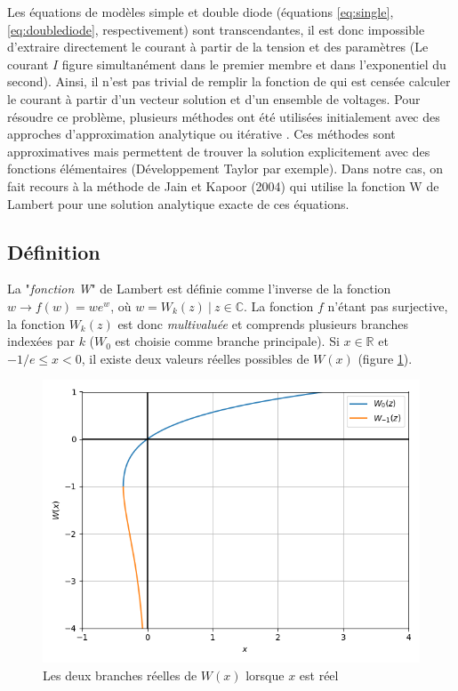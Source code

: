 Les équations de modèles simple et double diode (équations \ref{eq:single}, \ref{eq:doublediode}, respectivement) sont transcendantes, il est donc impossible d'extraire directement le courant à partir de la tension et des paramètres (Le courant $I$ figure simultanément dans le premier membre et dans l'exponentiel du second). Ainsi, il n'est pas trivial de remplir la fonction de  qui est censée calculer le courant à partir d'un vecteur solution et d'un ensemble de voltages. Pour résoudre ce problème, plusieurs méthodes ont été utilisées initialement avec des approches d'approximation analytique ou itérative \cite{Shur1991,AbuelmaAtti1992,Datta1992}. Ces méthodes sont approximatives mais permettent de trouver la solution explicitement avec des fonctions élémentaires (Développement Taylor par exemple). Dans notre cas, on fait recours à la méthode de Jain et Kapoor (2004) \cite{Jain2004, Lun2015} qui utilise la fonction W de Lambert pour une solution analytique exacte de ces équations.

\subsection{Définition}
La "\textit{fonction W}" de Lambert est définie comme l'inverse de la fonction $w \rightarrow f(w) =  w e^w$, où $w = W_k(z)\ |\ z \in \mathbb{C}$. La fonction $f$ n'étant pas surjective, la fonction $W_k(z)$ est donc \textit{multivaluée} et comprends plusieurs branches indexées par $k$ ($W_0$ est choisie comme branche principale). Si $x \in \mathbb{R}$ et $-1/e \leq x < 0$, il existe deux valeurs réelles possibles de $W(x)$ (figure \ref{fig:lambertw}).

\begin{figure}[H]
  \begin{center}
    \includegraphics[width=.8\textwidth]{resources/lambertw.png}
    \caption{Les deux branches réelles de $W(x)$ lorsque $x$ est réel}
    \label{fig:lambertw}
  \end{center}
\end{figure}

